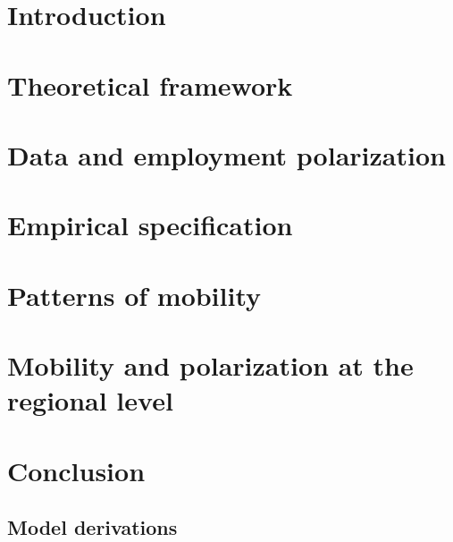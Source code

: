 \begin{refsection}
    
    \section{Introduction}\label{chap2-introduction}
    
    
    \section{Theoretical framework} \label{chap2-model}
    
    
    \section{Data and employment polarization} \label{chap2-data}
    
    
    \section{Empirical specification} \label{chap2-specification}
    
    
    \section{Patterns of mobility} \label{chap2-mobility}
    
    
    \section{Mobility and polarization at the regional level}\label{chap2-regional}
    
    
    \section{Conclusion} \label{chap2-conclusion}
    
    
    \printbibliography[heading=subbibintoc]
    
    \clearpage
    \renewcommand{\thesubsection}{\thechapter.\Alph{subsection}}
    
    \subsection{Model derivations}\label{chap2-app-model}
    
    \clearpage

\end{refsection}

